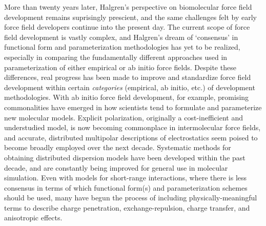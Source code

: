 More than twenty years later, Halgren's perspective on biomolecular force
field development remains suprisingly prescient, and the same challenges felt
by early force field developers continue into the present day. The current scope of
force field development is vastly complex, and Halgren's dream of
`consensus' in functional form and parameterization methodologies has yet to
be realized, especially in comparing the fundamentally different approaches
used in parameterization of either empirical or ab initio force fields.
%
Despite these differences, real progress has been made
to improve and standardize force field development within certain
\emph{categories}
(empirical, ab initio, etc.) of development methodologies. 
\cite{Wang2014a,Schmidt2015,Stone2007,Hagler2015,Wildman2016}
With ab
initio force field development, for example, promising commonalities 
have emerged in how scientists
tend to formulate and parameterize new molecular models. 
\cite{McDaniel2016a}
Explicit polarization, originally a cost-inefficient and understudied model, is
now becoming commonplace in intermolecular force fields,\cite{Cieplak2009} 
and accurate, distributed multipolar descriptions of electrostatics seem
poised to become broadly employed over the next
decade.
\cite{Albaugh2016,Cardamone2014,Ponder2010,Demerdash2014,Price2010a,Unke2017,Chaudret2013}
Systematic methods for obtaining distributed dispersion models have been
developed within the past decade,
and are constantly being improved for general use in molecular
simulation.
\cite{Price2000,Williams2003,Misquitta2008,McDaniel2013,McDaniel2014}
Even with models for short-range interactions, where there is less consensus in
terms of which functional form(s) and parameterization schemes should be used,
many have begun the process of 
including physically-meaningful terms to describe charge penetration,
\cite{Parker2015,Wang2015a,Freitag2000,Zgarbova2010,Misquitta2016,Wang2015,Slipchenko2009,Sherrill2009,Ohrn2016,Duke2014a}
exchange-repulsion,
\cite{Konieczny2015,VanVleet2016}
charge transfer,
\cite{Misquitta2013,Gordon2013,Vandenbrande2016,Duke2014a,Mei2015}
and anisotropic effects.
\cite{VanVleet2017,Bartocci2015,Stone2013,Duke2014a,Cisneros2006,Elking2010,Chaudret2014a,Gavezzotti2003,Torheyden2006,Stone2007,Mitchell2001,Price2000,Stone1988,Day2003,Totton2010,Misquitta2016,Price2010a,Misquitta2008,Langhoff1971,Williams2003,Stone2007,Krishtal2011}


